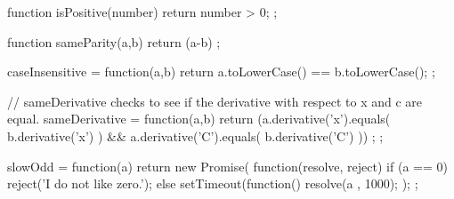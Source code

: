 \begin{javascript}
  function isPositive(number) {
    return number > 0;
  };

  function sameParity(a,b) {
    return (a-b)%
  };

  caseInsensitive = function(a,b) {
    return a.toLowerCase() == b.toLowerCase();
  };
  
// sameDerivative checks to see if the derivative with respect to x and c are equal.
  sameDerivative = function(a,b) {
    return (a.derivative('x').equals( b.derivative('x') ) && a.derivative('C').equals( b.derivative('C') )) ;
  };

  slowOdd = function(a) {
    return new Promise( function(resolve, reject) {
      if (a == 0)
        reject('I do not like zero.');
      else
        setTimeout(function(){
          resolve(a %
        }, 1000);      
    });
  };  
\end{javascript}
